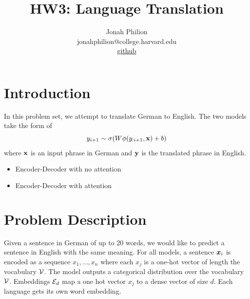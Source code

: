 \documentclass[11pt]{article}
\title{HW3: Language Translation}
\author{Jonah Philion \\ jonahphilion@college.harvard.edu \\ \href{https://github.com/jonahthelion/cs287-s18/tree/master/HW2}{github}}
\begin{document}
\maketitle{}
\section{Introduction}

In this problem set, we attempt to translate German to English. The two models take the form of
$$ y_{i+1} \sim \sigma(W\phi(y_{:i+1},{\bf x}) + b)$$
where ${\bf x}$ is an input phrase in German and ${\bf y}$ is the translated phrase in English.

\begin{itemize}
\item Encoder-Decoder with no attention
\item Encoder-Decoder with attention
\end{itemize}

%


\section{Problem Description}
Given a sentence in German of up to 20 words, we would like to predict a sentence in English with the same meaning.
For all models, a sentence $\boldsymbol{x}_i$ is encoded as a sequence $x_1,...,x_n$ where each $x_j$ is a one-hot vector of length the vocabulary $\mathcal{V}$. The model outputs a categorical distribution over the vocabulary $\mathcal{V}$. Embeddings $\mathcal{E}_d$ map a one hot vector $x_j$ to a dense vector of size $d$. Each language gets its own word embedding.
\end{document}
